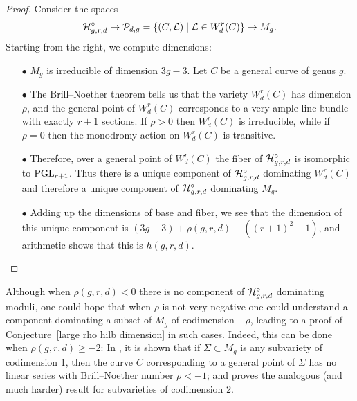 \begin{proof}
Consider the spaces
$$
\mathcal H^\circ_{g,r,d}
\to
\mathcal P_{d,g} = \{(C,{\mathcal L}) \mid {\mathcal L} \in W^r_d(C) \}
\to
M_g.
$$
Starting from the right, we compute dimensions:

\begin{enumerate}

\item[$\bullet$]  $M_g$ is irreducible of dimension $3g-3$. Let $C$
be a general curve of genus $g$.

\item[$\bullet$]
The Brill--Noether theorem tells us that the variety $W^r_d(C)$ has
dimension $\rho$, and the general point of $W^r_d(C)$ corresponds to a
very ample line bundle with exactly $r+1$ sections.
If $\rho>0$ then $W^r_d(C)$ is irreducible, while if $\rho = 0$ then
the monodromy action on $W^r_d(C)$
is transitive.

\item[$\bullet$] Therefore, over a general point of $W^r_d(C)$ the fiber
of $\mathcal H^\circ_{g,r,d} $ is
isomorphic to $\operatorname{PGL}_{r+1}$. Thus there is a unique component of
$\mathcal H^\circ_{g,r,d}$ dominating
$W^r_d(C)$ and therefore a unique component of $\mathcal H^\circ_{g,r,d}$
dominating $M_g$.

\item[$\bullet$] Adding up the dimensions of base and fiber, we see that
the dimension
of this unique component is $(3g-3)+\rho(g,r,d) +((r+1)^2-1)$,
and arithmetic shows that this is $h(g,r,d)$.
\end{enumerate}
\end{proof}

\begin{fact}\label{Hilb with rho geq -2}
 Although when $\rho(g,r,d)<0$ there is no component of
 $\mathcal H^{\circ}_{g,r,d}$ dominating moduli, one could hope
that when $\rho$ is not very negative one could understand a component
dominating a subset of $M_{g}$ of codimension $-\rho$, leading to a
proof of Conjecture~\ref{large rho hilb dimension} in such cases.
Indeed, this can be done when $\rho(g,r,d)\geq -2$:
In \cite{BrillNoether-1}, it is shown that if $\Sigma \subset M_g$
is any subvariety of codimension 1, then the curve $C$ corresponding
to a general point of $\Sigma$ has no linear series with Brill--Noether
number $\rho < -1$; and
 \cite{Edidin} proves the analogous
(and much harder) result for subvarieties of codimension 2.
\end{fact}


